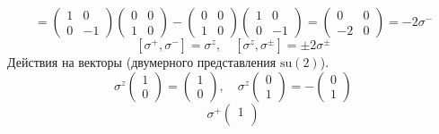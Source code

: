 \documentclass[12pt]{article}
\theoremstyle{definition}
\begin{document}
\begin{enumerate}
\begin{itemize}
\begin{equation}
            [\sigma^z,\sigma^-]=\begin{pmatrix}
                1 & 0\\
                0 & -1
            \end{pmatrix}\begin{pmatrix}
                0 & 0\\
                1 & 0
            \end{pmatrix}-\begin{pmatrix}
                0 & 0\\
                1 & 0
            \end{pmatrix}\begin{pmatrix}
                1 & 0\\
                0 & -1
            \end{pmatrix}=\begin{pmatrix}
                0 & 0\\
                -2 & 0
            \end{pmatrix}=-2\sigma^-
        \end{equation}
        \begin{equation}
            \boxed{[\sigma^+,\sigma^-]=\sigma^z,\quad [\sigma^z,\sigma^\pm]=\pm2\sigma^\pm}
        \end{equation}
        Действия на векторы (двумерного представления $\text{su}(2)$).
        \begin{equation}
            \sigma^z\begin{pmatrix}
                1\\
                0
            \end{pmatrix}=\begin{pmatrix}
                1\\
                0
            \end{pmatrix},\quad\sigma^z\begin{pmatrix}
                0\\
                1
            \end{pmatrix}=-\begin{pmatrix}
                0\\
                1
            \end{pmatrix}
        \end{equation}
        \begin{equation}
            \sigma^+\begin{pmatrix}
                1\\

\end{pmatrix}
\end{equation}
\end{itemize}
\end{enumerate}
\end{document}
